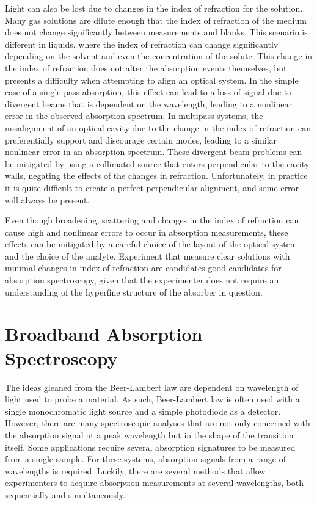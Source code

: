 Light can also be lost due to changes in the index of refraction for the
solution. Many gas solutions are dilute enough that the index of refraction of
the medium does not change significantly between measurements and blanks. This
scenario is different in liquids, where the index of refraction can change
significantly depending on the solvent and even the concentration of the
solute. This change in the index of refraction does not alter the absorption
events themselves, but presents a difficulty when attempting to align an
optical system. In the simple case of a single pass absorption, this effect can
lead to a loss of signal due to divergent beams that is dependent on the
wavelength, leading to a nonlinear error in the observed absorption spectrum.
In multipass systems, the misalignment of an optical cavity due to the change
in the index of refraction can preferentially support and discourage certain
modes, leading to a similar nonlinear error in an absorption spectrum. These
divergent beam problems can be mitigated by using a collimated source that
enters perpendicular to the cavity walls, negating the effects of the changes
in refraction. Unfortunately, in practice it is quite difficult to create a
perfect perpendicular alignment, and some error will always be present.

Even though broadening, scattering and changes in the index of refraction can
cause high and nonlinear errors to occur in absorption measurements, these
effects can be mitigated by a careful choice of the layout of the optical
system and the choice of the analyte. Experiment that measure clear solutions
with minimal changes in index of refraction are candidates good candidates for
absorption spectroscopy, given that the experimenter does not require an
understanding of the hyperfine structure of the absorber in question.



\section{Broadband Absorption Spectroscopy}\label{sec:broad_abs}

The ideas gleaned from the Beer-Lambert law are dependent on wavelength of
light used to probe a material. As such, Beer-Lambert law is often used with a
single monochromatic light source and a simple photodiode as a detector.
However, there are many spectroscopic analyses that are not only concerned with
the absorption signal at a peak wavelength but in the shape of the transition
itself. Some applications require several absorption signatures to be measured
from a single sample. For these systems, absorption signals from a range of
wavelengths is required. Luckily, there are several methods that allow
experimenters to acquire absorption measurements at several wavelengths, both
sequentially and simultaneously.



